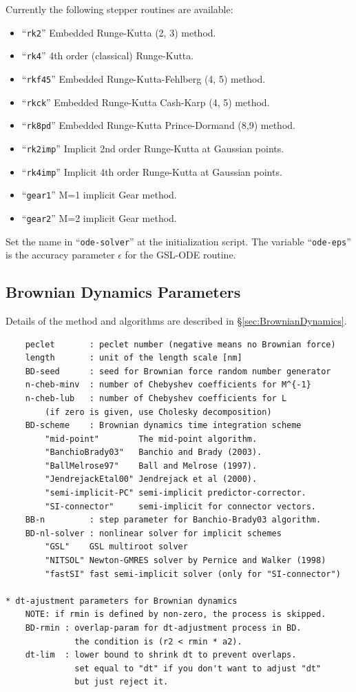\documentclass{book}
\begin{document}
Currently the following stepper routines are available:
\begin{itemize}
\item ``{\tt rk2}''       Embedded Runge-Kutta (2, 3) method.
\item ``{\tt rk4}''       4th order (classical) Runge-Kutta.
\item ``{\tt rkf45}''     Embedded Runge-Kutta-Fehlberg (4, 5) method.
\item ``{\tt rkck}''      Embedded Runge-Kutta Cash-Karp (4, 5) method.
\item ``{\tt rk8pd}''     Embedded Runge-Kutta Prince-Dormand (8,9) method.
\item ``{\tt rk2imp}''    Implicit 2nd order Runge-Kutta at Gaussian points.
\item ``{\tt rk4imp}''    Implicit 4th order Runge-Kutta at Gaussian points.
\item ``{\tt gear1}''     M=1 implicit Gear method.
\item ``{\tt gear2}''     M=2 implicit Gear method.
\end{itemize}
Set the name in ``{\tt ode-solver}'' at the initialization script. 
The variable ``{\tt ode-eps}'' is the accuracy parameter $\epsilon$ 
for the GSL-ODE routine. 


\subsection{Brownian Dynamics Parameters}
Details of the method and algorithms are described in 
\S \ref{sec:BrownianDynamics}. 
{\small
\begin{verbatim}
	peclet       : peclet number (negative means no Brownian force)
	length       : unit of the length scale [nm]
	BD-seed      : seed for Brownian force random number generator
	n-cheb-minv  : number of Chebyshev coefficients for M^{-1}
	n-cheb-lub   : number of Chebyshev coefficients for L
		(if zero is given, use Cholesky decomposition)
	BD-scheme    : Brownian dynamics time integration scheme
		"mid-point"        The mid-point algorithm.
		"BanchioBrady03"   Banchio and Brady (2003).
		"BallMelrose97"    Ball and Melrose (1997).
		"JendrejackEtal00" Jendrejack et al (2000).
		"semi-implicit-PC" semi-implicit predictor-corrector.
		"SI-connector"     semi-implicit for connector vectors.
	BB-n         : step parameter for Banchio-Brady03 algorithm.
	BD-nl-solver : nonlinear solver for implicit schemes
		"GSL"    GSL multiroot solver
		"NITSOL" Newton-GMRES solver by Pernice and Walker (1998)
		"fastSI" fast semi-implicit solver (only for "SI-connector")

* dt-ajustment parameters for Brownian dynamics
	NOTE: if rmin is defined by non-zero, the process is skipped.
	BD-rmin : overlap-param for dt-adjustment process in BD.
	          the condition is (r2 < rmin * a2).
	dt-lim  : lower bound to shrink dt to prevent overlaps.
	          set equal to "dt" if you don't want to adjust "dt"
	          but just reject it.
\end{verbatim}
}
\end{document}
